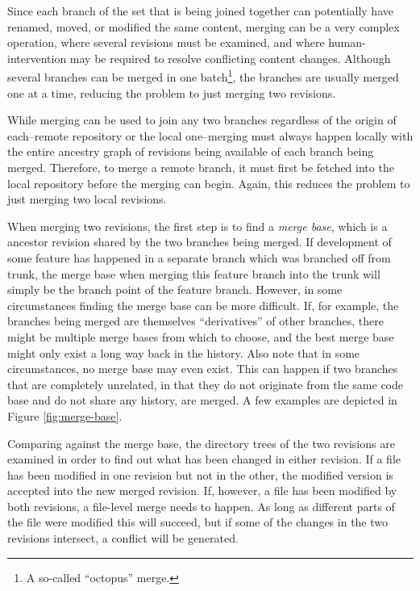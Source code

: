Since each branch of the set that is being joined together can potentially have renamed,
moved, or modified the same content, merging can be a very complex
operation, where several revisions must be examined, and where
human-intervention may be required to resolve conflicting content
changes. Although several branches can be merged in one
batch\footnote{A so-called ``octopus'' merge.}, the branches are
usually merged one at a time, reducing the problem to just merging two
revisions.

While merging can be used to join any two branches regardless of the
origin of each--remote repository or the local one--merging must
always happen locally with the entire ancestry graph of revisions
being available of each branch being merged. Therefore, to merge a remote
branch, it must first be fetched into the local repository before the
merging can begin.  Again, this reduces the problem to just merging
two local revisions.


When merging two revisions, the first step is to find a \emph{merge
base}, which is a ancestor revision shared by the two branches
being merged. If development of some feature has happened in a
separate branch which was branched off from trunk, the merge base when
merging this feature branch into the trunk will simply be the branch
point of the feature branch. However, in some circumstances finding
the merge base can be more difficult. If, for example, the branches
being merged are themselves ``derivatives'' of other branches, there
might be multiple merge bases from which to choose, and the best merge base
might only exist a long way back in the history. Also note that in
some circumstances, no merge base may even exist. This can happen if
two branches that are completely unrelated, in that they do not
originate from the same code base and do not share any history, are
merged. A few examples are depicted in Figure \ref{fig:merge-base}.

Comparing against the merge base, the directory trees of the two
revisions are examined in order to find out what has been changed in
either revision. If a file has been modified in one revision but not
in the other, the modified version is accepted into the new merged
revision.  If, however, a file has been modified by both revisions, a
file-level merge needs to happen. As long as different parts of the
file were modified this will succeed, but if some of the changes in
the two revisions intersect, a conflict will be generated.

